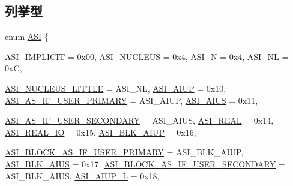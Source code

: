 \subsection*{列挙型}
\begin{DoxyCompactItemize}
\item 
enum \hyperlink{namespaceSparcISA_a6dd43f1311515252b283f56d7095a1f3}{ASI} \{ \par
\hyperlink{namespaceSparcISA_a6dd43f1311515252b283f56d7095a1f3aa054fb8d87e1ceec4e273f4636690a17}{ASI\_\-IMPLICIT} =  0x00, 
\hyperlink{namespaceSparcISA_a6dd43f1311515252b283f56d7095a1f3a7abf94ec93a8c60dcdf9cb89f9bf39be}{ASI\_\-NUCLEUS} =  0x4, 
\hyperlink{namespaceSparcISA_a6dd43f1311515252b283f56d7095a1f3a0401a622da9ee06093be26c0f7916f30}{ASI\_\-N} =  0x4, 
\hyperlink{namespaceSparcISA_a6dd43f1311515252b283f56d7095a1f3a30614290eb7e98666441aab1f9638c4a}{ASI\_\-NL} =  0xC, 
\par
\hyperlink{namespaceSparcISA_a6dd43f1311515252b283f56d7095a1f3a8eff77271357bc606c09fbd9815750b8}{ASI\_\-NUCLEUS\_\-LITTLE} =  ASI\_\-NL, 
\hyperlink{namespaceSparcISA_a6dd43f1311515252b283f56d7095a1f3a3d53402438058d4f84644e2f6c59a013}{ASI\_\-AIUP} =  0x10, 
\hyperlink{namespaceSparcISA_a6dd43f1311515252b283f56d7095a1f3a24e96e1d3cfe5ea47afc3c9e55d0cfeb}{ASI\_\-AS\_\-IF\_\-USER\_\-PRIMARY} =  ASI\_\-AIUP, 
\hyperlink{namespaceSparcISA_a6dd43f1311515252b283f56d7095a1f3aa3d80734431e33615a93b6e582a8da04}{ASI\_\-AIUS} =  0x11, 
\par
\hyperlink{namespaceSparcISA_a6dd43f1311515252b283f56d7095a1f3a56b6cc42aad4a616456dddb978521468}{ASI\_\-AS\_\-IF\_\-USER\_\-SECONDARY} =  ASI\_\-AIUS, 
\hyperlink{namespaceSparcISA_a6dd43f1311515252b283f56d7095a1f3ac1d083610cfc22b4c2c4342f1e7d717f}{ASI\_\-REAL} =  0x14, 
\hyperlink{namespaceSparcISA_a6dd43f1311515252b283f56d7095a1f3aa8242d17bdff731fa0f8cbcc0fa31a40}{ASI\_\-REAL\_\-IO} =  0x15, 
\hyperlink{namespaceSparcISA_a6dd43f1311515252b283f56d7095a1f3ab727126984382a19b9cf54122451b7e8}{ASI\_\-BLK\_\-AIUP} =  0x16, 
\par
\hyperlink{namespaceSparcISA_a6dd43f1311515252b283f56d7095a1f3a724fa3ad21d8f3c97cff350ab1a29f35}{ASI\_\-BLOCK\_\-AS\_\-IF\_\-USER\_\-PRIMARY} =  ASI\_\-BLK\_\-AIUP, 
\hyperlink{namespaceSparcISA_a6dd43f1311515252b283f56d7095a1f3a04fad95a98ffc8b2292774a650b08e52}{ASI\_\-BLK\_\-AIUS} =  0x17, 
\hyperlink{namespaceSparcISA_a6dd43f1311515252b283f56d7095a1f3accdfd68d0f6adafcb0971676bf77cfbe}{ASI\_\-BLOCK\_\-AS\_\-IF\_\-USER\_\-SECONDARY} =  ASI\_\-BLK\_\-AIUS, 
\hyperlink{namespaceSparcISA_a6dd43f1311515252b283f56d7095a1f3a0f67465d8ce0d5558f239ce226ec0550}{ASI\_\-AIUP\_\-L} =  0x18, 

\end{DoxyCompactItemize}
